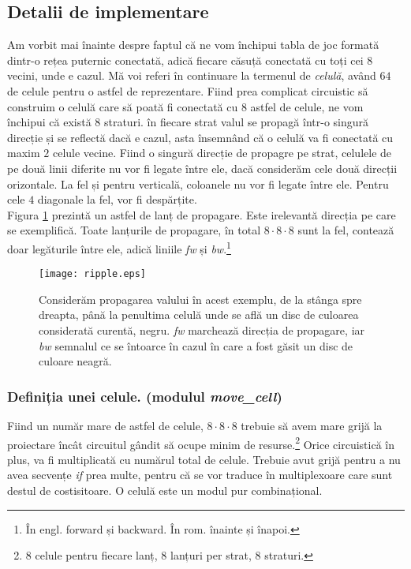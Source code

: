 \documentclass[12pt,twoside,a4paper,fleqn]{book}
\theoremstyle{definition}
\begin{document}
\subsection{Detalii de implementare}
Am vorbit mai înainte despre faptul că ne vom închipui tabla de joc formată dintr-o rețea puternic conectată, adică fiecare căsuță conectată cu toți cei $8$ vecini, unde e cazul. Mă voi referi în continuare la termenul de \emph{celulă}, având $64$ de celule pentru o astfel de reprezentare. Fiind prea complicat circuistic să construim o celulă care să poată fi conectată cu $8$ astfel de celule, ne vom închipui că există $8$ straturi. în fiecare strat valul se propagă într-o singură direcție și se reflectă dacă e cazul, asta însemnând că o celulă va fi conectată cu maxim $2$ celule vecine. Fiind o singură direcție de propagre pe strat, celulele de pe două linii diferite nu vor fi legate între ele, dacă considerăm cele două direcții orizontale. La fel și pentru verticală, coloanele nu vor fi legate între ele. Pentru cele $4$ diagonale la fel, vor fi despărțite.\\
Figura \ref{fig:fig_ripple} prezintă un astfel de lanț de propagare. Este irelevantă direcția pe care se exemplifică. Toate lanțurile de propagare, în total $8 \cdot 8 \cdot 8$ sunt la fel, contează doar legăturile între ele, adică liniile \emph{fw} și \emph{bw}.\footnote{În engl. forward și backward. În rom. înainte și înapoi.}
\begin{figure}[h]
\texttt{[image: ripple.eps]}
\caption{\small{Considerăm propagarea valului în acest exemplu, de la stânga spre dreapta, până la penultima celulă unde se află un disc de culoarea considerată curentă, negru. \emph{fw} marchează direcția de propagare, iar \emph{bw} semnalul ce se întoarce în cazul în care a fost găsit un disc de culoare neagră.}}
\label{fig:fig_ripple}
\end{figure}
\subsubsection{Definiția unei celule. (modulul \emph{move\_cell})}
Fiind un număr mare de astfel de celule, $8 \cdot 8 \cdot 8$ trebuie să avem mare grijă la proiectare încât circuitul gândit să ocupe minim de resurse.\footnote{8 celule pentru fiecare lanț, 8 lanțuri per strat, 8 straturi.}  Orice circuistică în plus, va fi multiplicată cu numărul total de celule. Trebuie avut grijă pentru a nu avea secvențe \emph{if} prea multe, pentru că se vor traduce în multiplexoare care sunt destul de costisitoare. O celulă este un modul pur combinațional.
\end{document}
